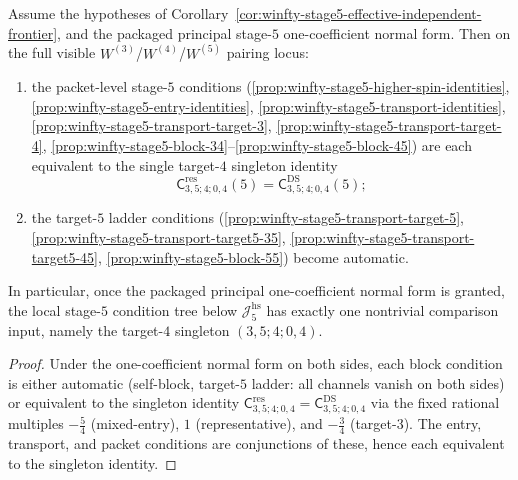 \begin{corollary}
\label{cor:winfty-stage5-visible-network-collapse}%
\label{cor:winfty-stage5-visible-conjecture-network-collapse}%
Assume the hypotheses of
Corollary~\ref{cor:winfty-stage5-effective-independent-frontier},
and
the packaged principal stage-$5$ one-coefficient normal form.
Then on the full visible
\texorpdfstring{$W^{(3)}$}{W3}/\texorpdfstring{$W^{(4)}$}{W4}/\texorpdfstring{$W^{(5)}$}{W5}
pairing locus:
\begin{enumerate}[label=\textup{(\roman*)}]
\item the packet-level stage-$5$ conditions
 \textup{(}\ref{prop:winfty-stage5-higher-spin-identities},
 \ref{prop:winfty-stage5-entry-identities},
 \ref{prop:winfty-stage5-transport-identities},
 \ref{prop:winfty-stage5-transport-target-3},
 \ref{prop:winfty-stage5-transport-target-4},
 \ref{prop:winfty-stage5-block-34}--\ref{prop:winfty-stage5-block-45}\textup{)}
 are each equivalent to the single target-$4$ singleton identity
 \[
 \mathsf{C}^{\mathrm{res}}_{3,5;4;0,4}(5)
 =
 \mathsf{C}^{\mathrm{DS}}_{3,5;4;0,4}(5);
 \]
\item the target-$5$ ladder conditions
 \textup{(}\ref{prop:winfty-stage5-transport-target-5},
 \ref{prop:winfty-stage5-transport-target5-35},
 \ref{prop:winfty-stage5-transport-target5-45},
 \ref{prop:winfty-stage5-block-55}\textup{)} become automatic.
\end{enumerate}
In particular, once the packaged principal one-coefficient normal form
is granted, the local stage-$5$ condition tree below
\(\mathcal{J}_5^{\mathrm{hs}}\) has exactly one nontrivial comparison
input, namely the target-$4$ singleton \((3,5;4;0,4)\).
\end{corollary}

\begin{proof}
Under the one-coefficient normal form on both sides, each block
condition is either automatic (self-block, target-$5$ ladder: all
channels vanish on both sides) or equivalent to the singleton identity
\(\mathsf{C}^{\mathrm{res}}_{3,5;4;0,4}=\mathsf{C}^{\mathrm{DS}}_{3,5;4;0,4}\)
via the fixed rational multiples \(-\tfrac54\) (mixed-entry), \(1\)
(representative), and \(-\tfrac34\) (target-$3$). The entry,
transport, and packet conditions are conjunctions of these, hence each
equivalent to the singleton identity.
\end{proof}


